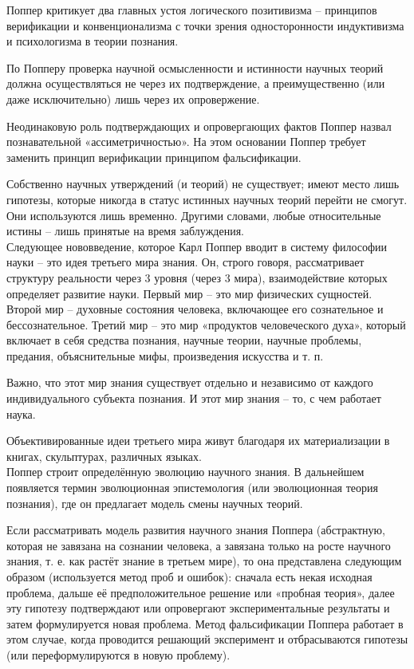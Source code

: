 \documentclass[exam_answers.tex]{subfiles}
\begin{document}
\renewcommand{\baselinestretch}{0.75}

Поппер критикует два главных устоя логического позитивизма – принципов верификации и конвенционализма с точки зрения односторонности индуктивизма и психологизма в теории познания.

По Попперу проверка научной осмысленности и истинности научных теорий должна осуществляться не через их подтверждение, а преимущественно (или даже исключительно) лишь через их опровержение.

Неодинаковую роль подтверждающих и опровергающих фактов Поппер назвал познавательной «ассиметричностью».
На этом основании Поппер требует заменить принцип верификации принципом фальсификации.

Собственно научных утверждений (и теорий) не существует; имеют место лишь гипотезы, которые никогда в статус истинных научных теорий перейти не смогут.
Они используются лишь временно.
Другими словами, любые относительные истины – лишь принятые на время заблуждения.
\\

Следующее нововведение, которое Карл Поппер вводит в систему философии науки – это идея третьего мира знания.
Он, строго говоря, рассматривает структуру реальности через 3 уровня (через 3 мира), взаимодействие которых определяет развитие науки.
Первый мир – это мир физических сущностей.
Второй мир – духовные состояния человека, включающее его сознательное и бессознательное.
Третий мир – это мир «продуктов человеческого духа», который включает в себя средства познания, научные теории, научные проблемы, предания, объяснительные мифы, произведения искусства и т. п. 

Важно, что этот мир знания существует отдельно и независимо от каждого индивидуального субъекта познания.
И этот мир знания – то, с чем работает наука.

Объективированные идеи третьего мира живут благодаря их материализации в книгах, скульптурах, различных языках.
\\

Поппер строит определённую эволюцию научного знания.
В дальнейшем появляется термин эволюционная эпистемология (или эволюционная теория познания), где он предлагает модель смены научных теорий.

Если рассматривать модель развития научного знания Поппера (абстрактную, которая не завязана на сознании человека, а завязана только на росте научного знания, т. е. как растёт знание в третьем мире), то она представлена следующим образом (используется метод проб и ошибок): сначала есть некая исходная проблема, дальше её предположительное решение или «пробная теория», далее эту гипотезу подтверждают или опровергают экспериментальные результаты и затем формулируется новая проблема.
Метод фальсификации Поппера работает в этом случае, когда проводится решающий эксперимент и отбрасываются гипотезы (или переформулируются в новую проблему).
\end{document}
